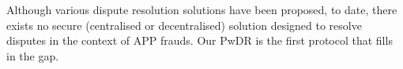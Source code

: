 Although various dispute resolution solutions have been proposed, to date, there exists no secure (centralised or decentralised) solution designed to resolve disputes in the context of APP frauds.  Our PwDR is the first protocol that fills in the gap. 

 



 

%





